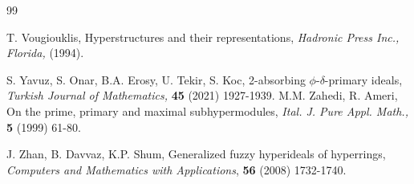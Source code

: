 \documentclass[preprint,review,10pt]{amsart}
\theoremstyle{definition}
\theoremstyle{remark}
\numberwithin{equation}{section}
\begin{document}
\begin{thebibliography}{99}



T. Vougiouklis, Hyperstructures and their representations, {\it Hadronic Press Inc., Florida, }(1994).

S. Yavuz, S. Onar, B.A. Erosy, U. Tekir, S. Koc, 2-absorbing $\phi$-$\delta$-primary ideals, {\it Turkish Journal of Mathematics,} {\bf 45} (2021) 1927-1939.
M.M. Zahedi, R. Ameri, On the prime, primary and maximal subhypermodules, {\it Ital. J. Pure Appl. Math.,} {\bf 5} (1999) 61-80.

  J. Zhan, B. Davvaz, K.P. Shum, Generalized fuzzy hyperideals of hyperrings, {\it Computers and Mathematics with Applications}, {\bf 56} (2008) 1732-1740.
\end{thebibliography}
\end{document}
